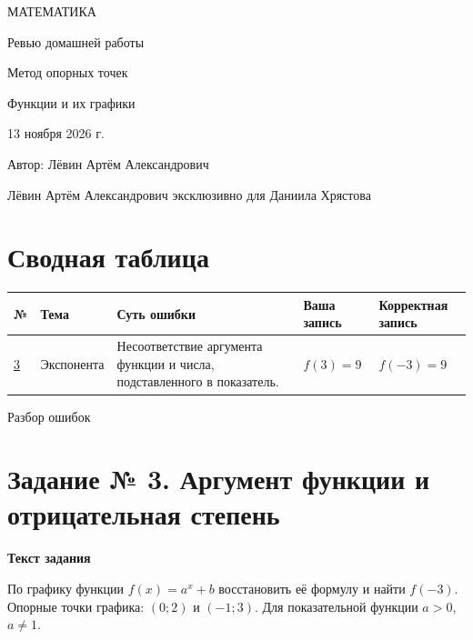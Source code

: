 \documentclass[a4paper,11pt]{article}
\newcommand{\para}[1]{\par\needspace{3\baselineskip}\textbf{#1}\par\nobreak}
\begin{document}
\thispagestyle{empty}
\begin{center}
\vspace*{30mm}
{\color{accent}\large МАТЕМАТИКА}\par
\vspace{17mm}
{\Huge Ревью домашней работы}\par
\vspace{13mm}
{\color{darkaccent}\Large Метод опорных точек}\par
\vspace{5mm}
{\large Функции и их графики}\par
\vspace{30mm}
{\normalsize 13 ноября 2026 г.}\par
\vspace{15mm}
{\normalsize Автор: Лёвин Артём Александрович}\par
\vfill
{\small Лёвин Артём Александрович эксклюзивно для Даниила Хрястова}\par
\vspace{13mm}
\end{center}
\clearpage
\section*{Сводная таблица}
\vspace{4mm}
\small
\begin{tabularx}{\linewidth}{@{}>{\centering\arraybackslash}p{13mm}p{22mm}X>{\centering\arraybackslash}p{25mm}>{\centering\arraybackslash}p{24mm}@{}}
\toprule
\textbf{№} & \textbf{Тема} & \textbf{Суть ошибки} & \textbf{Ваша запись} & \textbf{Корректная запись}\\
\midrule
\hyperref[task:3]{3} & Экспонента & Несоответствие аргумента функции и числа, подставленного в показатель. & $f(3)=9$ & $f(-3)=9$\\
\bottomrule
\end{tabularx}
\normalsize
\clearpage
\thispagestyle{empty}
\vspace*{\fill}
\begin{center}
{\color{darkaccent}\Huge Разбор ошибок}
\end{center}
\vspace*{\fill}
\clearpage
{}\label{task:3}
\section*{Задание № 3. Аргумент функции и отрицательная степень}
\para{Текст задания}
По графику функции $f(x)=a^x+b$ восстановить её формулу и найти $f(-3)$. Опорные точки графика: $(0;2)$ и $(-1;3)$. Для показательной функции $a>0$, $a\ne1$.
\end{document}
